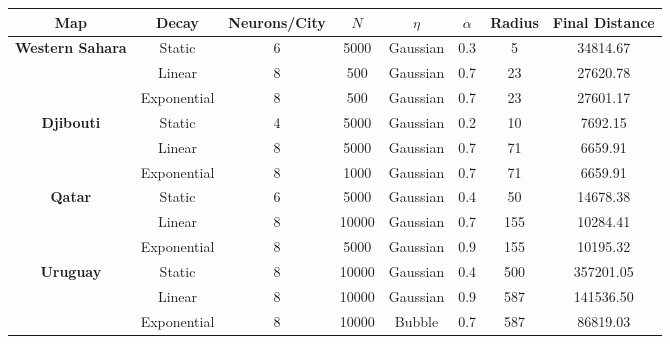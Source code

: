 \documentclass[11pt]{article}
\begin{document}
\begin{table}[ht]
  \begin{center}
    \begin{tabular}{| c | c | c | c | c | c | c | c |}
      \hline
      Map & Decay & Neurons/City & $N$
      & $\eta$ & $\alpha$ & Radius & Final Distance\\
      \hline
      \hline
      \multirow{3}{*}{\textbf{Western Sahara}}
        & Static & 6 & 5000 & Gaussian & 0.3 & 5 & 34814.67 \\
        & Linear & 8 & 500 & Gaussian & 0.7 & 23 & 27620.78 \\
        & Exponential & 8 & 500 & Gaussian & 0.7 & 23 & 27601.17 \\
      \hline
      \multirow{3}{*}{\textbf{Djibouti}}
        & Static & 4 & 5000 & Gaussian & 0.2 & 10 & 7692.15\\
        & Linear & 8 & 5000 & Gaussian & 0.7 & 71 & 6659.91 \\
        & Exponential & 8 & 1000 & Gaussian & 0.7 & 71 & 6659.91 \\
      \hline
      \multirow{3}{*}{\textbf{Qatar}}
        & Static & 6 & 5000 & Gaussian & 0.4 & 50 & 14678.38 \\
        & Linear & 8 & 10000 & Gaussian & 0.7 & 155 &10284.41 \\
        & Exponential & 8 & 5000 & Gaussian & 0.9 & 155 & 10195.32 \\
      \hline
      \multirow{3}{*}{\textbf{Uruguay}}
        & Static & 8 & 10000 & Gaussian & 0.4 & 500 & 357201.05 \\
        & Linear & 8 & 10000 & Gaussian & 0.9 & 587 & 141536.50 \\
        & Exponential & 8 & 10000 & Bubble & 0.7 & 587 & 86819.03 \\
      \hline
    \end{tabular}
  \end{center}
\end{table}
\end{document}
